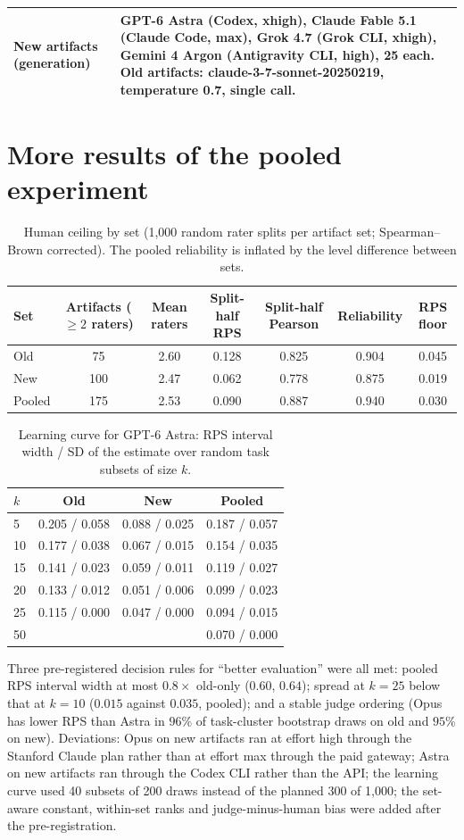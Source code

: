 \begin{table}[H]
\begin{tabular}{p{2.2cm}p{12.8cm}}
New artifacts (generation) & GPT-6 Astra (Codex, xhigh), Claude Fable 5.1 (Claude Code, max), Grok 4.7 (Grok CLI, xhigh), Gemini 4 Argon (Antigravity CLI, high), 25 each. Old artifacts: claude-3-7-sonnet-20250219, temperature 0.7, single call.\\
\bottomrule
\end{tabular}
\end{table}

\section{More results of the pooled experiment}
\label{app:more25}
\begin{table}[H]
\caption{Human ceiling by set (1{,}000 random rater splits per artifact set; Spearman--Brown corrected). The pooled reliability is inflated by the level difference between sets.}
\centering\small
\begin{tabular}{lcccccc}
\toprule
Set & Artifacts ($\ge 2$ raters) & Mean raters & Split-half RPS & Split-half Pearson & Reliability & RPS floor\\
\midrule
Old & 75 & 2.60 & 0.128 & 0.825 & 0.904 & 0.045\\
New & 100 & 2.47 & 0.062 & 0.778 & 0.875 & 0.019\\
Pooled & 175 & 2.53 & 0.090 & 0.887 & 0.940 & 0.030\\
\bottomrule
\end{tabular}
\end{table}
\begin{table}[H]
\caption{Learning curve for GPT-6 Astra: RPS interval width / SD of the estimate over random task subsets of size $k$.}
\centering\small
\begin{tabular}{lccc}
\toprule
$k$ & Old & New & Pooled\\
\midrule
5 & 0.205 / 0.058 & 0.088 / 0.025 & 0.187 / 0.057\\
10 & 0.177 / 0.038 & 0.067 / 0.015 & 0.154 / 0.035\\
15 & 0.141 / 0.023 & 0.059 / 0.011 & 0.119 / 0.027\\
20 & 0.133 / 0.012 & 0.051 / 0.006 & 0.099 / 0.023\\
25 & 0.115 / 0.000 & 0.047 / 0.000 & 0.094 / 0.015\\
50 & & & 0.070 / 0.000\\
\bottomrule
\end{tabular}
\end{table}
Three pre-registered decision rules for ``better evaluation'' were all met: pooled RPS interval width at most $0.8\times$ old-only ($0.60$, $0.64$); spread at $k=25$ below that at $k=10$ ($0.015$ against $0.035$, pooled); and a stable judge ordering (Opus has lower RPS than Astra in $96\%$ of task-cluster bootstrap draws on old and $95\%$ on new).
Deviations: Opus on new artifacts ran at effort high through the Stanford Claude plan rather than at effort max through the paid gateway; Astra on new artifacts ran through the Codex CLI rather than the API; the learning curve used 40 subsets of 200 draws instead of the planned 300 of 1{,}000; the set-aware constant, within-set ranks and judge-minus-human bias were added after the pre-registration.

